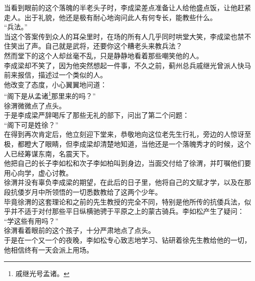 \begin{multicols}{\theparacolNo}
当看到眼前的这个落魄的半老头子时，李成梁差点准备让人给他盛点饭，让他赶紧走人。出于礼貌，他还是极有耐心地询问此人有何专长，能教些什么。\\

“兵法。”\\

当这个答案传到众人的耳朵里时，在场的所有人几乎同时哄堂大笑，李成梁也禁不住笑出了声。自己就是武将，还要你这个糟老头来教兵法？\\

然而堂下的这个人却丝毫不乱，只是静静地看着那些嘲笑他的人。\\

李成梁却不笑了，因为他突然想起一件事，不久之前，蓟州总兵戚继光曾派人快马前来报信，描述过一个类似的人。\\

他改变了态度，小心翼翼地问道：\\

“阁下是从孟诸\footnote{戚继光号孟诸。}那里来的吗？”\\

徐渭微微点了点头。\\

于是李成梁严辞喝斥了那些无礼的部下，问出了第二个问题：\\

“阁下可是姓徐？”\\

在得到再次肯定后，他立刻迎下堂来，恭敬地向这位老先生行礼，旁边的人惊讶至极，都瞪大了眼睛，但李成梁却清楚地知道，当他还是一个落魄秀才的时候，这个人已经筹谋东南，名震天下。\\

他把自己的长子李如松和次子李如柏叫到身边，当面交付给了徐渭，并叮嘱他们要用心向学，虚心讨教。\\

徐渭并没有辜负李成梁的期望，在此后的日子里，他将自己的文赋才学，以及在那段抗倭岁月中所领悟的一切悉数教给了这两个少年。\\

毕竟徐渭的这套理论和之前的先生教授的完全不同，特别是他所传的抗倭兵法，似乎并不适于对付那些平日纵横驰骋于平原之上的蒙古骑兵。李如松产生了疑问：\\

“学这些有用吗？”\\

徐渭看着眼前的这个孩子，十分严肃地点了点头。\\

于是在一个又一个的夜晚，李如松专心致志地学习、钻研着徐先生教给他的一切，他相信终有一天会派上用场。\\


\end{multicols}
